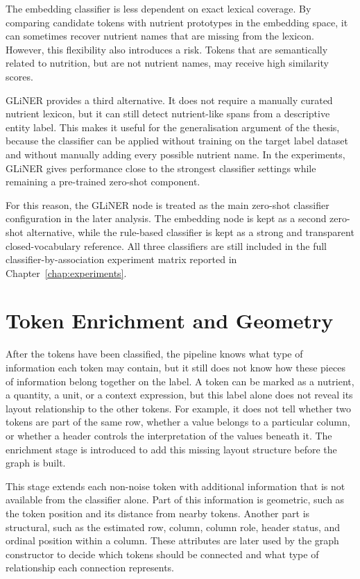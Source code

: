 The embedding classifier is less dependent on exact lexical coverage. By comparing candidate tokens with nutrient prototypes in the embedding space, it can sometimes recover nutrient names that are missing from the lexicon. However, this flexibility also introduces a risk. Tokens that are semantically related to nutrition, but are not nutrient names, may receive high similarity scores.

GLiNER provides a third alternative. It does not require a manually curated nutrient lexicon, but it can still detect nutrient-like spans from a descriptive entity label. This makes it useful for the generalisation argument of the thesis, because the classifier can be applied without training on the target label dataset and without manually adding every possible nutrient name. In the experiments, GLiNER gives performance close to the strongest classifier settings while remaining a pre-trained zero-shot component.

For this reason, the GLiNER node is treated as the main zero-shot classifier configuration in the later analysis. The embedding node is kept as a second zero-shot alternative, while the rule-based classifier is kept as a strong and transparent closed-vocabulary reference. All three classifiers are still included in the full classifier-by-association experiment matrix reported in Chapter~\ref{chap:experiments}.

\section{Token Enrichment and Geometry}\label{sec:enrichment}

After the tokens have been classified, the pipeline knows what type of information each token may contain, but it still does not know how these pieces of information belong together on the label. A token can be marked as a nutrient, a quantity, a unit, or a context expression, but this label alone does not reveal its layout relationship to the other tokens. For example, it does not tell whether two tokens are part of the same row, whether a value belongs to a particular column, or whether a header controls the interpretation of the values beneath it. The enrichment stage is introduced to add this missing layout structure before the graph is built.

This stage extends each non-noise token with additional information that is not available from the classifier alone. Part of this information is geometric, such as the token position and its distance from nearby tokens. Another part is structural, such as the estimated row, column, column role, header status, and ordinal position within a column. These attributes are later used by the graph constructor to decide which tokens should be connected and what type of relationship each connection represents.

